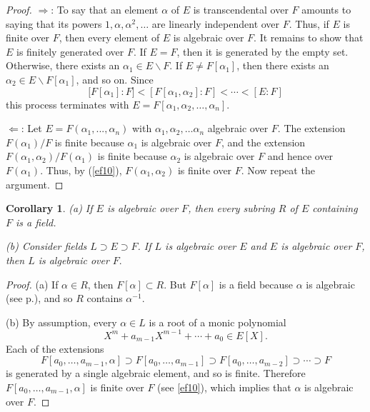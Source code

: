\documentclass[a4paper,11pt,final,openany]{memoir}
\newtheorem{corollary}[X]{Corollary}
\theoremstyle{nonumberplain}
\newtheorem{proof}{Proof.}
\begin{document}
\begin{proof}
$\Longrightarrow$: To say that an element $\alpha$ of $E$ is transcendental
over $F$ amounts to saying that its powers $1,\alpha,\alpha^{2},\ldots$ are
linearly independent over $F$. Thus, if $E$ is finite over $F$, then every
element of $E$ is algebraic over $F$. It remains to show that $E$ is finitely
generated over $F$. If $E=F$, then it is generated by the empty set.
Otherwise, there exists an $\alpha_{1}\in E\smallsetminus F$. If $E\neq
F[\alpha_{1}]$, then there exists an $\alpha_{2}\in E\smallsetminus
F[\alpha_{1}]$, and so on. Since
\[
\lbrack F[\alpha_{1}]\colon F]<[F[\alpha_{1},\alpha_{2}]\colon F]<\cdots
<[E\colon F]
\]
this process terminates with $E=F[\alpha_{1},\alpha_{2},\ldots,\alpha_{n}]$.

$\Longleftarrow$: Let $E=F(\alpha_{1},...,\alpha_{n})$ with $\alpha_{1}%
,\alpha_{2},\ldots\alpha_{n}$ algebraic over $F$. The extension $F(\alpha
_{1})/F$ is finite because $\alpha_{1}$ is algebraic over $F$, and the
extension $F(\alpha_{1},\alpha_{2})/F(\alpha_{1})$ is finite because
$\alpha_{2}$ is algebraic over $F$ and hence over $F(\alpha_{1})$. Thus, by
(\ref{ef10}), $F(\alpha_{1},\alpha_{2})$ is finite over $F$. Now repeat the argument.
\end{proof}

\begin{corollary}
\label{ef20}(a) If $E$ is algebraic over $F$, then every subring $R$ of $E$
containing $F$ is a field.

(b) Consider fields $L\supset E\supset F$. If $L$ is algebraic over $E$ and
$E$ is algebraic over $F$, then $L$ is algebraic over $F.$
\end{corollary}

\begin{proof}
(a) If $\alpha\in R$, then $F[\alpha]\subset R$. But $F[\alpha]$ is a field
because $\alpha$ is algebraic (see p.\thinspace\pageref{field}), and so $R$
contains $\alpha^{-1}$.

(b) By assumption, every $\alpha\in L$ is a root of a monic polynomial
\[
X^{m}+a_{m-1}X^{m-1}+\cdots+a_{0}\in E[X].
\]
Each of the extensions
\[
F[a_{0},\ldots,a_{m-1},\alpha]\supset F[a_{0},\ldots,a_{m-1}]\supset
F[a_{0},\ldots,a_{m-2}]\supset\cdots\supset F
\]
is generated by a single algebraic element, and so is finite. Therefore
$F[a_{0},\ldots,a_{m-1},\alpha]$ is finite over $F$ (see \ref{ef10}), which
implies that $\alpha$ is algebraic over $F$.
\end{proof}
\end{document}
